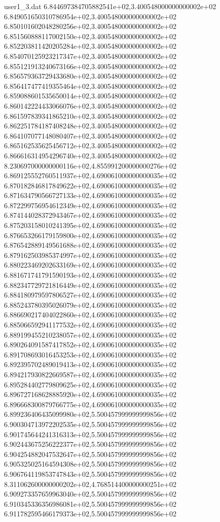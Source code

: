 \begin{filecontents}{user1_3.dat}
6.844697384705882541e+02,3.400548000000000002e+02
6.849051650310786954e+02,3.400548000000000002e+02
6.850101602048280256e+02,3.400548000000000002e+02
6.851560888117002150e+02,3.400548000000000002e+02
6.852203811420205284e+02,3.400548000000000002e+02
6.854070125923217347e+02,3.400548000000000002e+02
6.855121913240673166e+02,3.400548000000000002e+02
6.856579363729433680e+02,3.400548000000000002e+02
6.856417477419355464e+02,3.400548000000000002e+02
6.859088601535650014e+02,3.400548000000000002e+02
6.860142224433066076e+02,3.400548000000000002e+02
6.861597839341865210e+02,3.400548000000000002e+02
6.862251784187408248e+02,3.400548000000000002e+02
6.864107077148080407e+02,3.400548000000000002e+02
6.865162535625456712e+02,3.400548000000000002e+02
6.866616314954296740e+02,3.400548000000000002e+02
8.230697000000000116e+02,4.855991200000000276e+02
6.869125552760511937e+02,4.690061000000000035e+02
6.870182846817849622e+02,4.690061000000000035e+02
6.871634790566727133e+02,4.690061000000000035e+02
6.872299756954612349e+02,4.690061000000000035e+02
6.874144028372943467e+02,4.690061000000000035e+02
6.875203158010241395e+02,4.690061000000000035e+02
6.876653266179159800e+02,4.690061000000000035e+02
6.876542889149561688e+02,4.690061000000000035e+02
6.879162503985374997e+02,4.690061000000000035e+02
6.880223469202633169e+02,4.690061000000000035e+02
6.881671741791590193e+02,4.690061000000000035e+02
6.882347729721816449e+02,4.690061000000000035e+02
6.884180979597806527e+02,4.690061000000000035e+02
6.885243780395026079e+02,4.690061000000000035e+02
6.886690217404022860e+02,4.690061000000000035e+02
6.885066592941177532e+02,4.690061000000000035e+02
6.889199455210238057e+02,4.690061000000000035e+02
6.890264091587417852e+02,4.690061000000000035e+02
6.891708693016453253e+02,4.690061000000000035e+02
6.892395702489019413e+02,4.690061000000000035e+02
6.894217930822669587e+02,4.690061000000000035e+02
6.895284402779809625e+02,4.690061000000000035e+02
6.896727168628885920e+02,4.690061000000000035e+02
6.896668300879766775e+02,4.690061000000000035e+02
6.899236406435099980e+02,5.500457999999999856e+02
6.900304713972202535e+02,5.500457999999999856e+02
6.901745644241316313e+02,5.500457999999999856e+02
6.902443675256222377e+02,5.500457999999999856e+02
6.904254882047532647e+02,5.500457999999999856e+02
6.905325025164594308e+02,5.500457999999999856e+02
6.906764119853747843e+02,5.500457999999999856e+02
8.311062600000000202e+02,4.768514400000000251e+02
6.909273357659963040e+02,5.500457999999999856e+02
6.910345336356986081e+02,5.500457999999999856e+02
6.911782595466179373e+02,5.500457999999999856e+02

\end{filecontents}
